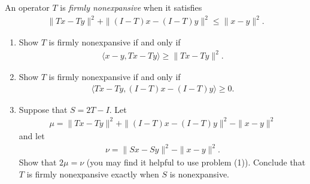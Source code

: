 \documentclass[10pt]{article}
\begin{document}
\begin{problem}[Problem 3]
An operator \( T \) is {\it firmly nonexpansive} when it satisfies 
\begin{align*}
    \|Tx - Ty\|^2 + \|(I-T) x - (I-T)y\|^2 \leq \|x-y\|^2. 
\end{align*}


\begin{enumerate}[nolistsep,label=(\alph*)]
\item Show \( T \) is firmly nonexpansive if and only if 
\begin{align*}
    \langle x-y, Tx - Ty \rangle \geq \|Tx - Ty\|^2. 
\end{align*}

\item Show \( T \) is firmly nonexpansive if and only if 
\begin{align*}
    \langle Tx - Ty, (I-T)x - (I-T)y \rangle \geq 0. 
\end{align*}

\item Suppose that \( S = 2T - I \). Let 
\begin{align*}
    \mu = \|Tx - Ty\|^2 + \|(I-T)x - (I-T)y\|^2 - \|x-y\|^2
\end{align*}
and let 
\begin{align*}
    \nu = \|Sx - Sy\|^2 - \|x-y\|^2.
\end{align*}
Show that \( 2\mu = \nu \) (you may find it helpful to use problem (1)). Conclude that 
\( T \) is firmly nonexpansive exactly when \( S \) is nonexpansive. 

\end{enumerate}
\end{problem}
\end{document}
